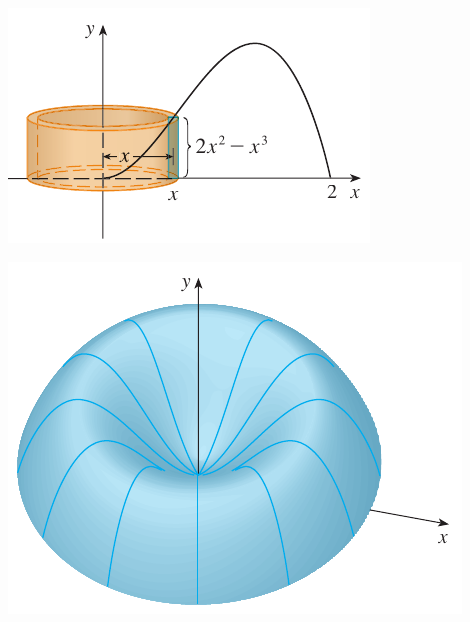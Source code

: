 \begin{frame}
\frametitle{ }


\begin{minipage}{0.5\textwidth}
\includegraphics[scale=0.6]{figuras/solido-cascas-clindricas1.png}
\end{minipage}
\begin{minipage}{0.4\textwidth}
\includegraphics[scale=0.5]{figuras/solido-cascas-clindricas2.png}
\end{minipage}

\end{frame}

%
%
%
%



